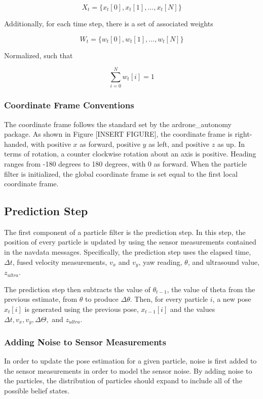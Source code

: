 \[
X_t = \{x_t[0], x_t[1],...,x_t[N]\}
\]

Additionally, for each time step, there is a set of associated weights

\[
W_t = \{w_t[0], w_t[1],...,w_t[N]\}
\]

Normalized, such that

\[
\sum_{i=0}^N w_t[i] = 1
\]


\subsubsection{Coordinate Frame Conventions}

The coordinate frame follows the standard set by the ardrone\_autonomy package. As shown in Figure [INSERT FIGURE], the coordinate frame is right-handed, with positive $x$ as forward, positive $y$ as left, and positive $z$ as up. In terms of rotation, a counter clockwise rotation about an axis is positive. Heading ranges from -180 degrees to 180 degrees, with 0 as forward. When the particle filter is initialized, the global coordinate frame is set equal to the first local coordinate frame.



\subsection{Prediction Step}

	The first component of a particle filter is the prediction step. In this step, the position of every particle is updated by using the sensor measurements contained in the navdata messages. Specifically, the prediction step uses the elapsed time, $\Delta t$, fused velocity measurements, $v_x$ and $v_y$, yaw reading, $\theta$, and ultrasound value, $z_{ultra}$.

	The prediction step then subtracts the value of $\theta_{t-1}$, the value of theta from the previous estimate, from $\theta$ to produce $\Delta\theta$. Then, for every particle $i$, a new pose $x_t[i]$ is generated using the previous pose, $x_{t-1}[i]$ and the values $\Delta t, v_x, v_y, \Delta\Theta,$ and $z_{ultra}$.

	\subsubsection{Adding Noise to Sensor Measurements}
		In order to update the pose estimation for a given particle, noise is first added to the sensor measurements in order to model the sensor noise. By adding noise to the particles, the distribution of particles should expand to include all of the possible belief states. 

